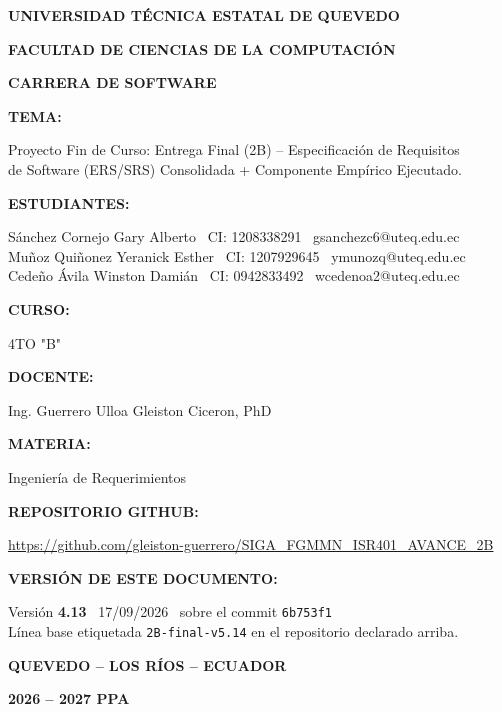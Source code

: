 \documentclass[11pt,a4paper]{article}
\title{}
\date{}
\begin{document}
\begin{titlepage}
\centering
{\bfseries\Large UNIVERSIDAD T\'ECNICA ESTATAL DE QUEVEDO\par}
\vspace{2mm}
{\bfseries\large FACULTAD DE CIENCIAS DE LA COMPUTACI\'ON\par}
\vspace{2mm}
{\bfseries\large CARRERA DE SOFTWARE\par}
\vspace{10mm}
{\bfseries TEMA:\par}
\vspace{2mm}
Proyecto Fin de Curso: Entrega Final (2B) -- Especificaci\'on de Requisitos\\
de Software (ERS/SRS) Consolidada + Componente Emp\'irico Ejecutado.
\vspace{8mm}

{\bfseries ESTUDIANTES:\par}
\vspace{2mm}
S\'anchez Cornejo Gary Alberto \textbar\ CI: 1208338291 \textbar\ gsanchezc6@uteq.edu.ec\\
Mu\~noz Qui\~nonez Yeranick Esther \textbar\ CI: 1207929645 \textbar\ ymunozq@uteq.edu.ec\\
Cede\~no \'Avila Winston Dami\'an \textbar\ CI: 0942833492 \textbar\ wcedenoa2@uteq.edu.ec
\vspace{8mm}

{\bfseries CURSO:\par}
4TO "B"
\vspace{6mm}

{\bfseries DOCENTE:\par}
Ing. Guerrero Ulloa Gleiston Ciceron, PhD
\vspace{6mm}

{\bfseries MATERIA:\par}
Ingenier\'ia de Requerimientos
\vspace{6mm}

{\bfseries REPOSITORIO GITHUB:\par}
\url{https://github.com/gleiston-guerrero/SIGA_FGMMN_ISR401_AVANCE_2B}
\vspace{6mm}

{\bfseries VERSI\'ON DE ESTE DOCUMENTO:\par}
\vspace{2mm}
Versi\'on \textbf{4.13} \textbar\ 17/09/2026 \textbar\ sobre el commit \texttt{6b753f1}\\
L\'inea base etiquetada \texttt{2B-final-v5.14} en el repositorio declarado arriba.
\vspace{8mm}

{\bfseries QUEVEDO -- LOS R\'IOS -- ECUADOR\par}
{\bfseries 2026 -- 2027 PPA\par}
\end{titlepage}
\end{document}
